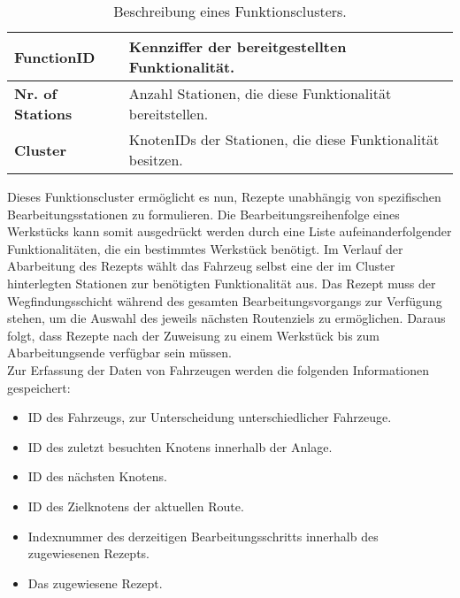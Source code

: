 			\begin{table}[h]
				\begin{longtable}{| l | l |}
					
					\hline
					\textbf{FunctionID} & Kennziffer der bereitgestellten Funktionalität.\\ \hline
					\textbf{Nr. of Stations} & Anzahl Stationen, die diese Funktionalität bereitstellen.\\ \hline
					\textbf{Cluster} & KnotenIDs der Stationen, die diese Funktionalität besitzen.\\
					\hline
					
				\end{longtable}
				\vspace{0.2cm}
				\caption{Beschreibung eines Funktionsclusters.}
			\end{table}
			
			Dieses Funktionscluster ermöglicht es nun, Rezepte unabhängig von spezifischen Bearbeitungsstationen zu formulieren. Die Bearbeitungsreihenfolge eines Werkstücks kann somit ausgedrückt werden durch eine Liste aufeinanderfolgender Funktionalitäten, die ein bestimmtes Werkstück benötigt. Im Verlauf der Abarbeitung des Rezepts wählt das Fahrzeug selbst eine der im Cluster hinterlegten Stationen zur benötigten Funktionalität aus. Das Rezept muss der Wegfindungsschicht während des gesamten Bearbeitungsvorgangs zur Verfügung stehen, um die Auswahl des jeweils nächsten Routenziels zu ermöglichen. Daraus folgt, dass Rezepte nach der Zuweisung zu einem Werkstück bis zum Abarbeitungsende verfügbar sein müssen.
			\\[4pt]
			Zur Erfassung der Daten von Fahrzeugen werden die folgenden Informationen gespeichert:
			
			\begin{itemize}
				\item ID des Fahrzeugs, zur Unterscheidung unterschiedlicher Fahrzeuge.
				\item ID des zuletzt besuchten Knotens innerhalb der Anlage.
				\item ID des nächsten Knotens. 
				\item ID des Zielknotens der aktuellen Route.
				\item Indexnummer des derzeitigen Bearbeitungsschritts innerhalb des zugewiesenen Rezepts.
				\item Das zugewiesene Rezept.
			\end{itemize} 
			
